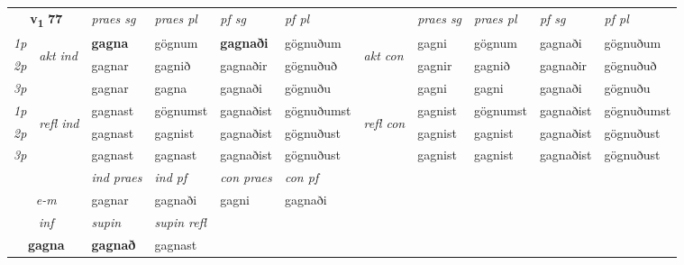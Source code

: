 \noindent
\begin{tabular}{lllllllllll} \toprule
\multicolumn{2}{c}{\textbf{v{\textsubscript{1}}} \Large{\textbf{77}}}  &  \textit{praes sg}  & \textit{praes pl}  &\textit{ pf sg} & \textit{pf pl} &  &  \textit{praes sg}  & \textit{praes pl}  & \textit{pf sg} & \textit{pf pl } \\*
	\cmidrule{3-6} \cmidrule{8-11}
 {\textit{1p}} & \multirow{3}{*}{\begin{turn}{90}\textit{akt ind}\end{turn}} & \textbf{gagna} & gögnum & \textbf{gagnaði} & gögnuðum & \multirow{3}{*}{\begin{turn}{90}\textit{akt con}\end{turn}} &gagni & gögnum & gagnaði & gögnuðum\\*
 {\textit{2p}} &  &  gagnar  & gagnið & gagnaðir & gögnuðuð & & gagnir & gagnið & gagnaðir & gögnuðuð \\*
{\textit{3p}} &  & gagnar & gagna & gagnaði & gögnuðu & & gagni & gagni& gagnaði & gögnuðu \\*
\cmidrule{3-6} \cmidrule{8-11}
 {\textit{1p}} & \multirow{3}{*}{\begin{turn}{90}\textit{refl ind}\end{turn}}  & gagnast & gögnumst & gagnaðist & gögnuðumst & \multirow{3}{*}{\begin{turn}{90}\textit{refl con}\end{turn}}  &gagnist & gögnumst & gagnaðist & gögnuðumst \\*
 {\textit{2p}} &  & gagnast & gagnist & gagnaðist & gögnuðust & &gagnist & gagnist & gagnaðist & gögnuðust \\*
 {\textit{3p}}  & & gagnast & gagnast & gagnaðist & gögnuðust & & gagnist & gagnist& gagnaðist & gögnuðust \\*
\cmidrule{3-6} \cmidrule{8-11}

   & &  \textit{ind praes} & \textit{ind pf} & \textit{con praes} & \textit{con pf} \\*
\multicolumn{2}{c}{ \textit{e-m} } & gagnar & gagnaði & gagni & gagnaði \\*

\cmidrule{3-4}
   \multicolumn{2}{c}{\textit{inf}}      & \textit{supin} & \textit{supin refl}  \\*
  \multicolumn{2}{c}{\textbf{gagna}}       &  \textbf{gagnað} & gagnast  \\*
\end{tabular}

